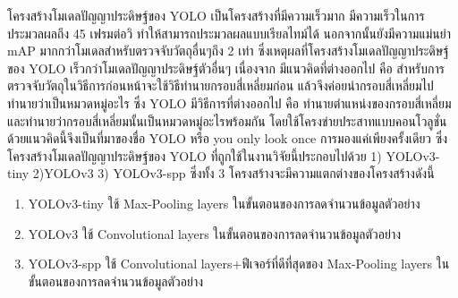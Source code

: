 โครงสร้างโมเดลปัญญาประดิษฐ์ของ YOLO เป็นโครงสร้างที่มีความเร็วมาก มีความเร็วในการประมวลผลถึง 45 เฟรมต่อวิ ทำให้สามารถประมวลผลแบบเรียลไทม์ได้ นอกจากนั้นยังมีความแม่นยำ mAP มากกว่าโมเดลสำหรับตรวจจับวัตถุอื่นๆถึง 2 เท่า ซึ่งเหตุผลที่โครงสร้างโมเดลปัญญาประดิษฐ์ของ YOLO เร็วกว่าโมเดลปัญญาประดิษฐ์ตัวอื่นๆ เนื่องจาก มีแนวคิดที่ต่างออกไป คือ สำหรับการตรวจจับวัตถุในวิธีการก่อนหน้าจะใช้วิธีทำนายกรอบสี่เหลี่ยมก่อน แล้วจึงค่อยนำกรอบสี่เหลี่ยมไปทำนายว่าเป็นหมวดหมู่อะไร ซึ่ง YOLO มีวิธีการที่ต่างออกไป คือ ทำนายตำแหน่งของกรอบสี่เหลี่ยมและทำนายว่ากรอบสี่เหลี่ยมนั้นเป็นหมวดหมู่อะไรพร้อมกัน โดยใช้โครงข่ายประสาทแบบคอนโวลูชั่น ด้วยแนวคิดนี้จึงเป็นที่มาของชื่อ YOLO หรือ you only look once การมองแค่เพียงครั้งเดียว ซึ่งโครงสร้างโมเดลปัญญาประดิษฐ์ของ YOLO ที่ถูกใช้ในงานวิจัยนี้ประกอบไปด้วย 1) YOLOv3-tiny 2)YOLOv3 3) YOLOv3-spp	ซึ่งทั้ง 3 โครงสร้างจะมีความแตกต่างของโครงสร้างดังนี้
\begin{enumerate}
	\setlength\itemsep{-0.25em}
	\item YOLOv3-tiny ใช้ Max-Pooling layers ในขั้นตอนของการลดจำนวนข้อมูลตัวอย่าง
	\item YOLOv3 ใช้ Convolutional layers ในขั้นตอนของการลดจำนวนข้อมูลตัวอย่าง
	\item YOLOv3-spp ใช้ Convolutional layers+ฟีเจอร์ที่ดีที่สุดของ Max-Pooling layers ในขั้นตอนของการลดจำนวนข้อมูลตัวอย่าง
\end{enumerate}

